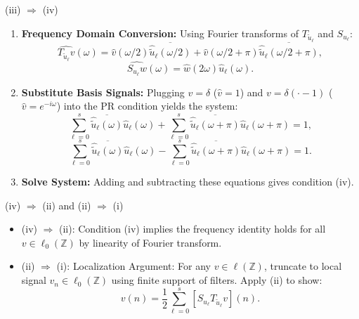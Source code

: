 \documentclass[11pt]{beamer}
\begin{document}
\begin{frame}{(iii) $\Rightarrow$ (iv)}
  \begin{enumerate}
    \item \textbf{Frequency Domain Conversion:} Using Fourier transforms of $T_{\tilde{u}_\ell}$ and $S_{u_\ell}$:
          \[
            \widehat{T_{\tilde{u}_\ell} v}(\omega) = \hat{v}(\omega/2)\overline{\hat{\tilde{u}}_\ell(\omega/2)} + \hat{v}(\omega/2+\pi)\overline{\hat{\tilde{u}}_\ell(\omega/2+\pi)},
          \]
          \[
            \widehat{S_{u_\ell} w}(\omega) = \hat{w}(2\omega)\hat{u}_\ell(\omega).
          \]

    \item \textbf{Substitute Basis Signals:} Plugging $v = \delta$ ($\hat{v}=1$) and $v = \delta(\cdot-1)$ ($\hat{v}=e^{-i\omega}$) into the PR condition yields the system:
          \[
            \sum_{\ell=0}^s \overline{\hat{\tilde{u}}_\ell(\omega)}\hat{u}_\ell(\omega) + \sum_{\ell=0}^s \overline{\hat{\tilde{u}}_\ell(\omega+\pi)}\hat{u}_\ell(\omega+\pi) = 1,
          \]
          \[
            \sum_{\ell=0}^s \overline{\hat{\tilde{u}}_\ell(\omega)}\hat{u}_\ell(\omega) - \sum_{\ell=0}^s \overline{\hat{\tilde{u}}_\ell(\omega+\pi)}\hat{u}_\ell(\omega+\pi) = 1.
          \]

    \item \textbf{Solve System:} Adding and subtracting these equations gives condition (iv).
  \end{enumerate}
\end{frame}

\begin{frame}{(iv) $\Rightarrow$ (ii) and (ii) $\Rightarrow$ (i)}
  \begin{itemize}
    \item (iv) $\Rightarrow$ (ii): Condition (iv) implies the frequency identity holds for all $v \in \ell_0(\mathbb{Z})$ by linearity of Fourier transform.
    \item (ii) $\Rightarrow$ (i):  {Localization Argument:} For any $v \in \ell(\mathbb{Z})$, truncate to local signal $v_n \in \ell_0(\mathbb{Z})$ using finite support of filters. Apply (ii) to show:
          \[
            v(n) = \frac{1}{2}\sum_{\ell=0}^s [S_{u_\ell} T_{\tilde{u}_\ell} v](n).
          \]
  \end{itemize}
\end{frame}
\end{document}
